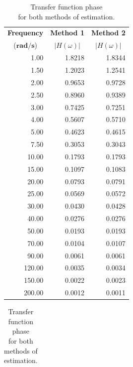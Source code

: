 \documentclass{article}
\begin{document}
\begin{table}[H]
	\hspace{0.5cm}
	\begin{minipage}{7cm}
		\centering
		\caption{Transfer function magnitude\\ for both methods of estimation.}
		\begin{tabular}{rrr}
			\toprule
			\multicolumn{1}{c}{\textbf{Frequency}} & 
			\multicolumn{1}{c}{\textbf{Method 1}} & \multicolumn{1}{c}{\textbf{Method 2}}\\
			\multicolumn{1}{c}{($\mathbf{\si{\radian\per\second}}$)} & 
			\multicolumn{1}{c}{$|H(\omega)|$} & \multicolumn{1}{c}{$|H(\omega)|$}\\
			\midrule
			1.00    &	1.8218	&	1.8344\\
			1.50    &	1.2023	&	1.2541\\
			2.00    &	0.9653	&	0.9728\\
			2.50    &	0.8960	&	0.9389\\
			3.00    &	0.7425	&	0.7251\\
			4.00    &	0.5607	&	0.5710\\
			5.00    &	0.4623	&	0.4615\\
			7.50    &	0.3053	&	0.3043\\
			10.00   &	0.1793	&	0.1793\\
			15.00   & 	0.1097	&	0.1083\\
			20.00   & 	0.0793	&	0.0791\\
			25.00   & 	0.0569	&	0.0572\\
			30.00   & 	0.0430	&	0.0428\\
			40.00   & 	0.0276	&	0.0276\\
			50.00   & 	0.0193	&	0.0193\\
			70.00   & 	0.0104	&	0.0107\\
			90.00   & 	0.0061	&	0.0061\\
			120.00  &  	0.0035	&	0.0034\\
			150.00  &  	0.0022	&	0.0023\\
			200.00  &  	0.0012	&	0.0011\\
			\bottomrule
		\end{tabular}
	\end{minipage}
	\hspace{1cm}
	\begin{minipage}{7cm}
		\centering
		\caption{Transfer function phase\\ for both methods of estimation.}
		\begin{tabular}{rrr}

\end{tabular}
\end{minipage}
\end{table}
\end{document}
